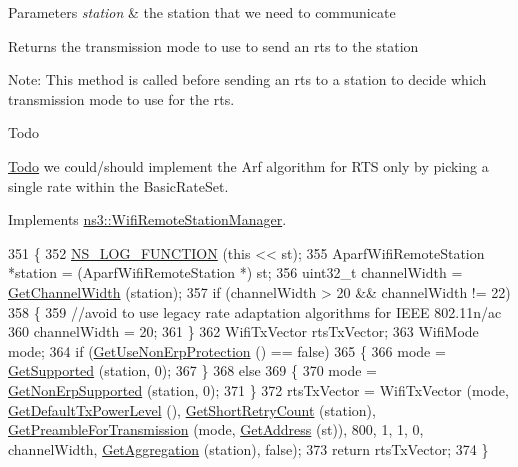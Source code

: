 \begin{DoxyParams}{Parameters}
{\em station} & the station that we need to communicate\\
\hline
\end{DoxyParams}
\begin{DoxyReturn}{Returns}
the transmission mode to use to send an rts to the station
\end{DoxyReturn}
Note\+: This method is called before sending an rts to a station to decide which transmission mode to use for the rts. \begin{DoxyRefDesc}{Todo}
\item[\hyperlink{todo__todo000168}{Todo}]we could/should implement the Arf algorithm for R\+TS only by picking a single rate within the Basic\+Rate\+Set. \end{DoxyRefDesc}


Implements \hyperlink{classns3_1_1WifiRemoteStationManager_abf44eccb31d4b1b58644fd6721d132c9}{ns3\+::\+Wifi\+Remote\+Station\+Manager}.


\begin{DoxyCode}
351 \{
352   \hyperlink{log-macros-disabled_8h_a90b90d5bad1f39cb1b64923ea94c0761}{NS\_LOG\_FUNCTION} (\textcolor{keyword}{this} << st);
355   AparfWifiRemoteStation *station = (AparfWifiRemoteStation *) st;
356   uint32\_t channelWidth = \hyperlink{classns3_1_1WifiRemoteStationManager_a918213c5b9fa629c4986f6d90521bbd4}{GetChannelWidth} (station);
357   \textcolor{keywordflow}{if} (channelWidth > 20 && channelWidth != 22)
358     \{
359       \textcolor{comment}{//avoid to use legacy rate adaptation algorithms for IEEE 802.11n/ac}
360       channelWidth = 20;
361     \}
362   WifiTxVector rtsTxVector;
363   WifiMode mode;
364   \textcolor{keywordflow}{if} (\hyperlink{classns3_1_1WifiRemoteStationManager_a2d3d93f08995e554960a177a52f90f2f}{GetUseNonErpProtection} () == \textcolor{keyword}{false})
365     \{
366       mode = \hyperlink{classns3_1_1WifiRemoteStationManager_a995c8bae0d84b168fd3e8bc9ecaacdd4}{GetSupported} (station, 0);
367     \}
368   \textcolor{keywordflow}{else}
369     \{
370       mode = \hyperlink{classns3_1_1WifiRemoteStationManager_a3df8f1931f1fce653e5990a2821b44c6}{GetNonErpSupported} (station, 0);
371     \}
372   rtsTxVector = WifiTxVector (mode, \hyperlink{classns3_1_1WifiRemoteStationManager_acff2fc859ee6b4c66ea7a83dd075b5d6}{GetDefaultTxPowerLevel} (), 
      \hyperlink{classns3_1_1WifiRemoteStationManager_ad61157a9a56cf668f3255730f6a416b2}{GetShortRetryCount} (station), \hyperlink{classns3_1_1WifiRemoteStationManager_a0f44967cbd7488baada4802ebc642110}{GetPreambleForTransmission} (mode,
       \hyperlink{classns3_1_1WifiRemoteStationManager_ac9ccc8c514bd8d2af05c290e63461a2a}{GetAddress} (st)), 800, 1, 1, 0, channelWidth, \hyperlink{classns3_1_1WifiRemoteStationManager_a5421c8d510cb16eebeac9f2ea9dd73c3}{GetAggregation} (station), \textcolor{keyword}{false});
373   \textcolor{keywordflow}{return} rtsTxVector;
374 \}
\end{DoxyCode}


